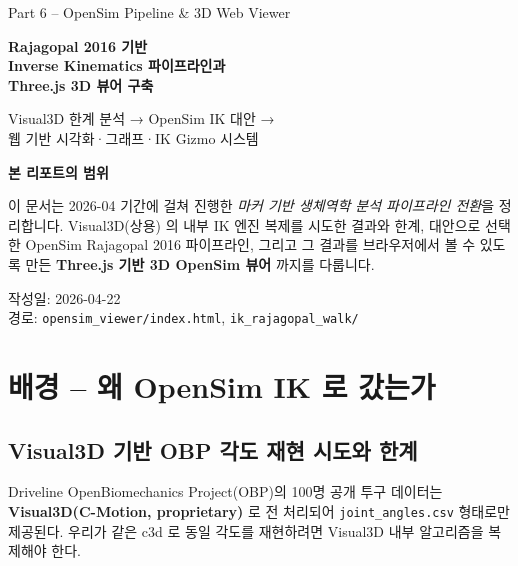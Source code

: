 \documentclass[11pt, a4paper]{report}
\begin{document}
\begin{titlepage}
\centering
\vspace*{2cm}
{\Large\color{gray} Part 6 -- OpenSim Pipeline \& 3D Web Viewer}
\vspace{0.6cm}

{\Huge\bfseries\color{defblue} Rajagopal 2016 기반\\[0.3cm]
Inverse Kinematics 파이프라인과\\[0.3cm]
Three.js 3D 뷰어 구축}

\vspace{0.8cm}

{\large\color{defblue!70!black} Visual3D 한계 분석 → OpenSim IK 대안 →\\
웹 기반 시각화·그래프·IK Gizmo 시스템}

\vspace{2cm}

\begin{tcolorbox}[colback=defblue!5, colframe=defblue!40, width=0.8\textwidth,
  arc=4pt, boxrule=0.6pt]
\centering\small
\textbf{본 리포트의 범위}

\medskip
이 문서는 2026-04 기간에 걸쳐 진행한 \emph{마커 기반 생체역학 분석
파이프라인 전환}을 정리합니다. Visual3D(상용) 의 내부 IK 엔진 복제를
시도한 결과와 한계, 대안으로 선택한 OpenSim Rajagopal 2016 파이프라인,
그리고 그 결과를 브라우저에서 볼 수 있도록 만든 \textbf{Three.js 기반 3D
OpenSim 뷰어} 까지를 다룹니다.
\end{tcolorbox}

\vfill
{\small\color{gray}
작성일: 2026-04-22 \\
경로: \texttt{opensim\_viewer/index.html}, \texttt{ik\_rajagopal\_walk/}}
\end{titlepage}

\tableofcontents
\newpage

\chapter{배경 -- 왜 OpenSim IK 로 갔는가}

\section{Visual3D 기반 OBP 각도 재현 시도와 한계}

Driveline OpenBiomechanics Project(OBP)의 100명 공개 투구 데이터는
\textbf{Visual3D(C-Motion, proprietary)} 로 전 처리되어
\texttt{joint\_angles.csv} 형태로만 제공된다. 우리가 같은 c3d 로
동일 각도를 재현하려면 Visual3D 내부 알고리즘을 복제해야 한다.
\end{document}
